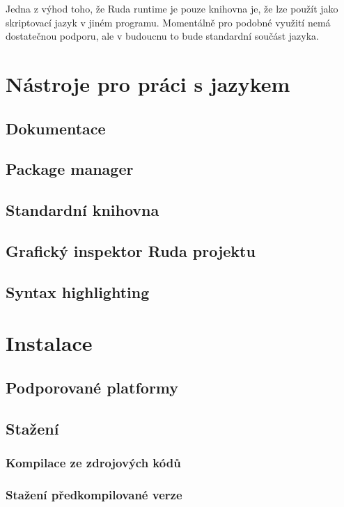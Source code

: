 \documentclass[12pt, a4paper,
twoside,        %
openright
]{report}
\let\oldchapter\chapter
\renewcommand{\chapter}{
	\clearpage
	\pagestyle{fancy}
	\oldchapter
}
\begin{document}
Jedna z výhod toho, že Ruda runtime je pouze knihovna je, že lze použít jako skriptovací jazyk v jiném programu. Momentálně pro podobné využití nemá dostatečnou podporu, ale v budoucnu to bude standardní součást jazyka.

\chapter{Nástroje pro práci s jazykem}

\section{Dokumentace}

\section{Package manager}

\section{Standardní knihovna}

\section{Grafický inspektor Ruda projektu}

\section{Syntax highlighting}

\chapter{Instalace}

\section{Podporované platformy}

\section{Stažení}

\subsection{Kompilace ze zdrojových kódů}

\subsection{Stažení předkompilované verze}
\end{document}
